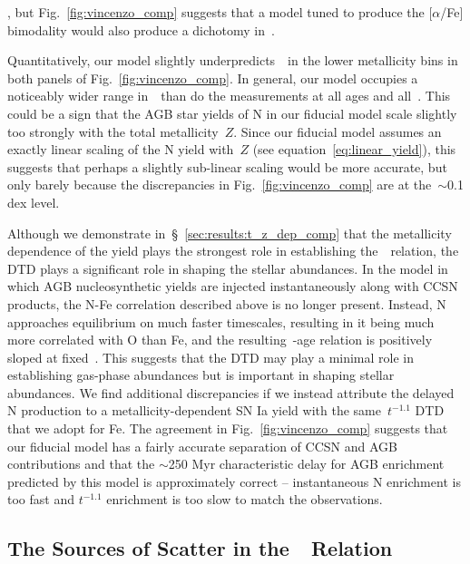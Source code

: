 \documentclass[ms.tex]{subfiles}
\begin{document}
\citep[e.g.][]{Hayden2015, Vincenzo2021b}, but Fig.~\ref{fig:vincenzo_comp}
suggests that a model tuned to produce the [$\alpha$/Fe] bimodality would also
produce a dichotomy in~\no.
\par
Quantitatively, our model slightly underpredicts~\no~in the lower metallicity
bins in both panels of Fig.~\ref{fig:vincenzo_comp}.
In general, our model occupies a noticeably wider range in~\no~than do the
\citet{Vincenzo2021} measurements at all ages and all~\ofe.
This could be a sign that the AGB star yields of N in our fiducial model scale
slightly too strongly with the total metallicity~$Z$.
Since our fiducial model assumes an exactly linear scaling of the N yield
with~$Z$ (see equation~\ref{eq:linear_yield}), this suggests that perhaps a
slightly sub-linear scaling would be more accurate, but only barely because
the discrepancies in Fig.~\ref{fig:vincenzo_comp} are at the~$\sim$0.1 dex
level.
\par
Although we demonstrate in~\S~\ref{sec:results:t_z_dep_comp} that the
metallicity dependence of the yield plays the strongest role in establishing
the~\ohno~relation, the DTD plays a significant role in shaping the stellar
abundances.
In the model in which AGB nucleosynthetic yields are injected instantaneously
along with CCSN products, the N-Fe correlation described above is no longer
present.
Instead, N approaches equilibrium on much faster timescales, resulting in it
being much more correlated with O than Fe, and the resulting~\no-age relation
is positively sloped at fixed~\feh.
This suggests that the DTD may play a minimal role in establishing gas-phase
abundances but is important in shaping stellar abundances.
We find additional discrepancies if we instead attribute the delayed N
production to a metallicity-dependent SN Ia yield with the same~$t^{-1.1}$ DTD
that we adopt for Fe.
The agreement in Fig.~\ref{fig:vincenzo_comp} suggests that our fiducial model
has a fairly accurate separation of CCSN and AGB contributions and that the
$\sim$250 Myr characteristic delay for AGB enrichment predicted by this model
is approximately correct -- instantaneous N enrichment is too fast and
$t^{-1.1}$ enrichment is too slow to match the observations.

\subsection{The Sources of Scatter in the~\ohno~Relation}
\label{sec:results:schaefer_comp}
\end{document}
